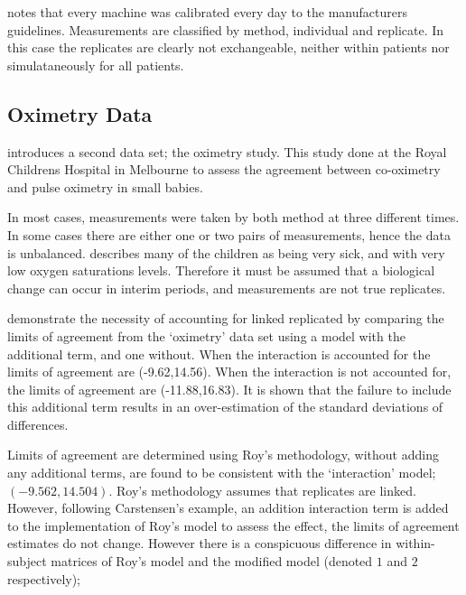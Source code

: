 \documentclass[12pt, a4paper]{report}
\theoremstyle{plain}
\theoremstyle{definition}
\theoremstyle{remark}
\begin{document}
	\citet{BXC2008} notes that every machine was calibrated every day to  the manufacturers guidelines.
	Measurements are classified by method, individual and replicate. In this case the replicates are clearly not exchangeable, neither within patients nor simulataneously for all patients.
	
	
	\subsection{Oximetry Data}
	\citet{BXC2008} introduces a second data set; the oximetry study. This study done at the Royal Childrens Hospital in
	Melbourne to assess the agreement between co-oximetry and pulse oximetry in small babies.
	
	In most cases, measurements were taken by both method at three different times. In some cases there are either one or two pairs of measurements, hence the data is unbalanced. \citet{BXC2008} describes many of the children as being very sick, and with very low oxygen saturations levels. Therefore it must be assumed that a biological change can occur in interim periods, and measurements are not true replicates.
	
	\citet{BXC2008} demonstrate the necessity of accounting for linked replicated by comparing the limits of agreement from the `oximetry' data set using a model with the additional term, and one without. When the interaction is accounted for the limits of agreement are (-9.62,14.56). When the interaction is not accounted for, the limits of agreement are (-11.88,16.83). It is shown that the failure to include this additional term results in an over-estimation of the standard deviations of differences.
	
	Limits of agreement are determined using Roy's methodology, without adding any additional terms, are found to be consistent with the `interaction' model; $(-9.562, 14.504 )$. Roy's methodology assumes that replicates are linked. However, following Carstensen's example, an addition interaction term is added to the implementation of Roy's model to assess the effect, the limits of agreement estimates do not change. However there is a conspicuous difference in within-subject matrices of Roy's model and the modified model (denoted $1$ and $2$ respectively);
	
\end{document}
